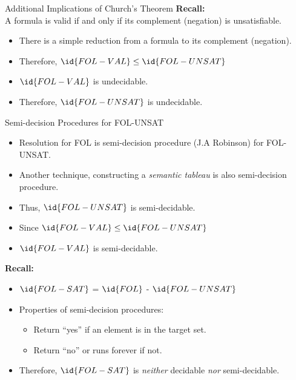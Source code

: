 \begin{wideslide}[bm=,toc=]{Additional Implications of Church's Theorem}
{\bf Recall:}\\
A formula is valid if and only if its complement (negation) is unsatisfiable.
\begin{itemize}
\item There is a simple reduction from a formula to its complement (negation).
\item Therefore, $\id{FOL-VAL} \leq \id{FOL-UNSAT}$ 
\item $\id{FOL-VAL}$ is undecidable.
\item Therefore, $\id{FOL-UNSAT}$ is undecidable.
\end{itemize}
\end{wideslide}

\begin{wideslide}[bm=,toc=]{Semi-decision Procedures for FOL-UNSAT}
\begin{itemize}
\item Resolution for FOL is semi-decision procedure (J.A Robinson) for FOL-UNSAT.
\item Another technique, constructing a \emph{semantic tableau} is also
semi-decision procedure.
\item Thus, $\id{FOL-UNSAT}$ is semi-decidable.
\item Since $\id{FOL-VAL} \leq \id{FOL-UNSAT}$ 
\item $\id{FOL-VAL}$ is semi-decidable. 
\end{itemize}
{\bf Recall:} 
\begin{itemize}
\item $\id{FOL-SAT}$ = $\id{FOL}$ - $\id{FOL-UNSAT}$
\item Properties of semi-decision procedures:
\begin{itemize}
\item Return ``yes'' if an element is in the target set.
\item Return ``no'' or runs forever if not.
\end{itemize}
\item Therefore, $\id{FOL-SAT}$ is \emph{neither} decidable \emph{nor}
semi-decidable.
\end{itemize}

\end{wideslide}

